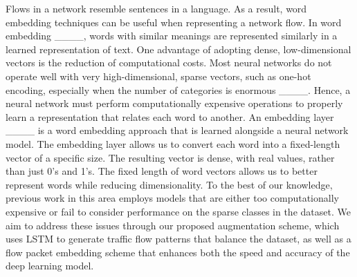 Flows in a network resemble sentences in a language. As a result, word embedding techniques can be useful when representing a network flow. In word embedding ____, words with similar meanings are represented similarly in a learned representation of text. One advantage of adopting dense, low-dimensional vectors is the reduction of computational costs. Most neural networks do not operate well with very high-dimensional, sparse vectors, such as one-hot encoding, especially when the number of categories is enormous ____. Hence, a neural network must perform computationally expensive operations to properly learn a representation that relates each word to another. An embedding layer ____ is a word embedding approach that is learned alongside a neural network model. The embedding layer allows us to convert each word into a fixed-length vector of a specific size. The resulting vector is dense, with real values, rather than just 0’s and 1’s. The fixed length of word vectors allows us to better represent words while reducing dimensionality. To the best of our knowledge, previous work in this area employs models that are either too computationally expensive or fail to consider performance on the sparse classes in the dataset. We aim to address these issues through our proposed augmentation scheme, which uses LSTM to generate traffic flow patterns that balance the dataset, as well as a flow packet embedding scheme that enhances both the speed and accuracy of the deep learning model.